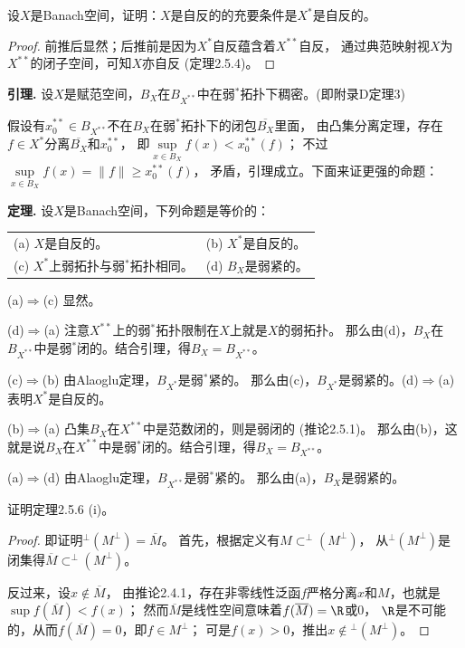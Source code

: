 \begin{9}
    设$X$是Banach空间，证明：$X$是自反的的充要条件是$X^*$是自反的。
\end{9}
\begin{proof}
    前推后显然；后推前是因为$X^*$自反蕴含着$X^{**}$自反，
    通过典范映射视$X$为$X^{**}$的闭子空间，可知$X$亦自反 (定理2.5.4)。
\end{proof}
\begin{enhanced}
    
    \textbf{引理.} 设$X$是赋范空间，$B_X$在$B_{X^{**}}$中在弱$^*$拓扑下稠密。(即附录D定理3)
    
    假设有$x_0^{**}\in B_{X^{**}}$不在$B_X$在弱$^*$拓扑下的闭包$\overline{B_X}$里面，
    由凸集分离定理，存在$f\in X^*$分离$\overline{B_X}$和$x_0^{**}$，
    即$\sup\limits_{x\in B_X}f(x)<x_0^{**}(f)$；
    不过$\sup\limits_{x\in B_X}f(x)=\|f\|\geqslant x_0^{**}(f)$，
    矛盾，引理成立。下面来证更强的命题：

    \textbf{定理.} 设$X$是Banach空间，下列命题是等价的：
    \begin{center}\begin{tabular}{ll}
        (a) $X$是自反的。&(b) $X^*$是自反的。\qquad\\
        (c) $X^*$上弱拓扑与弱$^*$拓扑相同。&(d) $B_X$是弱紧的。\qquad
    \end{tabular}\end{center}

    (a)$\Rightarrow$(c) 显然。

    (d)$\Rightarrow$(a) 注意$X^{**}$上的弱$^*$拓扑限制在$X$上就是$X$的弱拓扑。
    那么由(d)，$B_X$在$B_{X^{**}}$中是弱$^*$闭的。结合引理，得$B_X=B_{X^{**}}$。

    (c)$\Rightarrow$(b) 由Alaoglu定理，$B_{X^*}$是弱$^*$紧的。
    那么由(c)，$B_{X^*}$是弱紧的。(d)$\Rightarrow$(a)表明$X^*$是自反的。

    (b)$\Rightarrow$(a) 凸集$B_X$在$X^{**}$中是范数闭的，则是弱闭的 (推论2.5.1)。
    那么由(b)，这就是说$B_X$在$X^{**}$中是弱$^{*}$闭的。结合引理，得$B_X=B_{X^{**}}$。
    
    (a)$\Rightarrow$(d) 由Alaoglu定理，$B_{X^{**}}$是弱$^*$紧的。
    那么由(a)，$B_X$是弱紧的。
\end{enhanced}

\begin{10}
    证明定理2.5.6 (i)。
\end{10}
\begin{proof}
    即证明$^\perp(M^\perp)=\overline{M}$。
    首先，根据定义有$M\subset^\perp\!\!(M^\perp)$，
    从$^\perp(M^\perp)$是闭集得$\overline{M}\subset^\perp\!\!(M^\perp)$。

    反过来，设$x\notin\overline{M}$，
    由推论2.4.1，存在非零线性泛函$f$严格分离$x$和$M$，也就是$\sup f(\overline{M})<f(x)$；
    然而$\overline{M}$是线性空间意味着$f(\overline{M})=\R$或$0$，
    $\R$是不可能的，从而$f(\overline{M})=0$，即$f\in M^\perp$；
    可是$f(x)>0$，推出$x\notin\!{ }^\perp(M^\perp)$。
\end{proof}

